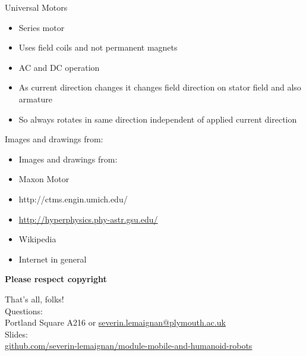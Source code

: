 \documentclass[compress]{beamer}
\begin{document}
\begin{frame}{Universal Motors}

\begin{itemize}

\item Series motor
\item Uses field coils and not permanent magnets
\item AC and DC operation
\item As current direction changes it changes field direction on stator
  field and also armature
\item So always rotates in same direction independent of applied current
  direction
\end{itemize}

\end{frame}

\begin{frame}{Images and drawings from:}

\begin{itemize}

\item Images and drawings from:
\item Maxon Motor
\item http://ctms.engin.umich.edu/
\item \url{http://hyperphysics.phy-astr.gsu.edu/}
\item Wikipedia
\item Internet in general
\end{itemize}

\textbf{Please respect copyright}

\end{frame}


\begin{frame}{}
    \begin{center}
        \Large
        That's all, folks!\\[2em]
        \normalsize
        Questions:\\
        Portland Square A216 or \url{severin.lemaignan@plymouth.ac.uk} \\[1em]

        Slides:\\ \href{https://github.com/severin-lemaignan/module-mobile-and-humanoid-robots}{\small github.com/severin-lemaignan/module-mobile-and-humanoid-robots}

    \end{center}
\end{frame}
\end{document}
